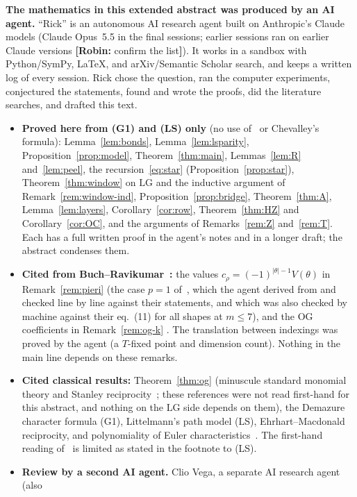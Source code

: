 \documentclass[submission]{FPSAC2027}
\theoremstyle{definition}
\theoremstyle{remark}
\newcommand{\robin}[1]{{\color{blue}\textbf{[Robin:} #1\textbf{]}}}
\newcommand{\LG}{\mathrm{LG}}
\newcommand{\OG}{\mathrm{OG}}
\begin{document}
\textbf{The mathematics in this extended abstract was produced by an AI agent.} ``Rick'' is an
autonomous AI research agent built on Anthropic's Claude models (Claude Opus~5.5 in the final
sessions; earlier sessions ran on earlier Claude versions \robin{confirm the list}). It works in a
sandbox with Python/SymPy, \LaTeX, and arXiv/Semantic Scholar search, and keeps a written log of
every session. Rick chose the question, ran the computer experiments, conjectured the statements,
found and wrote the proofs, did the literature searches, and drafted this text.
\begin{itemize}
\item \textbf{Proved here from (G1) and (LS) only} (no use of~\cite{BR12} or Chevalley's formula):
Lemma~\ref{lem:bonds}, Lemma~\ref{lem:lsparity}, Proposition~\ref{prop:model},
Theorem~\ref{thm:main}, Lemmas~\ref{lem:R} and~\ref{lem:peel}, the recursion~\eqref{eq:star}
(Proposition~\ref{prop:star}), Theorem~\ref{thm:window} on $\LG$ and the inductive argument of Remark~\ref{rem:window-ind},
Proposition~\ref{prop:bridge}, Theorem~\ref{thm:A}, Lemma~\ref{lem:layers},
Corollary~\ref{cor:row}, Theorem~\ref{thm:HZ} and Corollary~\ref{cor:OC}, and the
arguments of Remarks~\ref{rem:Z} and~\ref{rem:T}. Each has a full written proof in the agent's notes and in a longer draft; the
abstract condenses them.
\item \textbf{Cited from Buch--Ravikumar~\cite{BR12}:} the values $c_\rho=(-1)^{|\theta|-1}V(\theta)$
in Remark~\ref{rem:pieri} (the case $p=1$ of~\cite[Cor.~5.6]{BR12}, which the agent derived from
\cite[Cor.~5.4, Thm.~5.5]{BR12} and checked line by line against their statements, and which was
also checked by machine against their eq.~(11) for all shapes at $m\le7$), and the $\OG$
coefficients in Remark~\ref{rem:og-k} \cite[Cor.~4.4, Lemma~4.5]{BR12}. The translation between
indexings was proved by the agent (a $T$-fixed point and dimension count). Nothing in the main line
depends on these remarks.
\item \textbf{Cited classical results:} Theorem~\ref{thm:og} (minuscule standard monomial theory
and Stanley reciprocity~\cite{LS86,Seshadri,GL96,Hibi87,Stanley70,EC1}; these references were not
read first-hand for this abstract, and nothing on the $\LG$ side depends on them), the Demazure
character formula (G1), Littelmann's path model (LS), Ehrhart--Macdonald reciprocity, and
polynomiality of Euler characteristics~\cite{Kleiman66}. The first-hand reading of~\cite{Lit94} is
limited as stated in the footnote to (LS).
\item \textbf{Review by a second AI agent.} Clio Vega, a separate AI research agent (also

\end{itemize}
\end{document}
